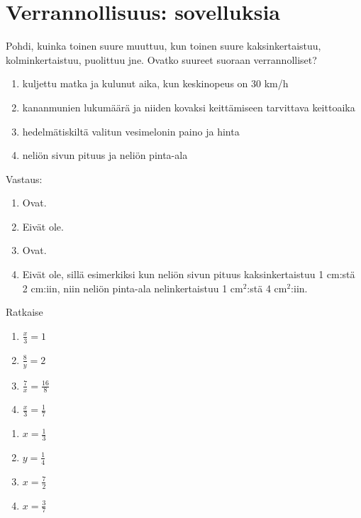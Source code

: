 
\chapter{Verrannollisuus: sovelluksia}

\begin{tehtava}
    Pohdi, kuinka toinen suure muuttuu, kun toinen suure kaksinkertaistuu,
    kolminkertaistuu, puolittuu jne. Ovatko suureet suoraan verrannolliset?
    
    \begin{enumerate}
        \item kuljettu matka ja kulunut aika, kun keskinopeus on 30 km/h
        \item kananmunien lukumäärä ja niiden kovaksi keittämiseen tarvittava keittoaika
        \item hedelmätiskiltä valitun vesimelonin paino ja hinta
        \item neliön sivun pituus ja neliön pinta-ala
    \end{enumerate}
    
    \begin{vastaus}
        Vastaus:
        \begin{enumerate}
            \item Ovat.
            \item Eivät ole.
            \item Ovat.
            \item Eivät ole, sillä esimerkiksi kun neliön sivun pituus
                kaksinkertaistuu 1 cm:stä 2 cm:iin, niin neliön pinta-ala
                nelinkertaistuu 1 cm$^2$:stä 4 cm$^2$:iin.
        \end{enumerate}
    \end{vastaus}
\end{tehtava}

\begin{tehtava}
Ratkaise
\begin{enumerate}
\item $ \frac{x}{3} = 1$
\item $ \frac{8}{y} = 2$
\item $ \frac{7}{x} = \frac{16}{8}$
\item $ \frac{x}{3} = \frac{1}{7}$
\end{enumerate}
\begin{vastaus}
\begin{enumerate}
\item $x= \frac{1}{3}$
\item $y= \frac{1}{4}$
\item $x= \frac{7}{2}$
\item $x= \frac{3}{7}$
\end{enumerate}
\end{vastaus}
\end{tehtava}

